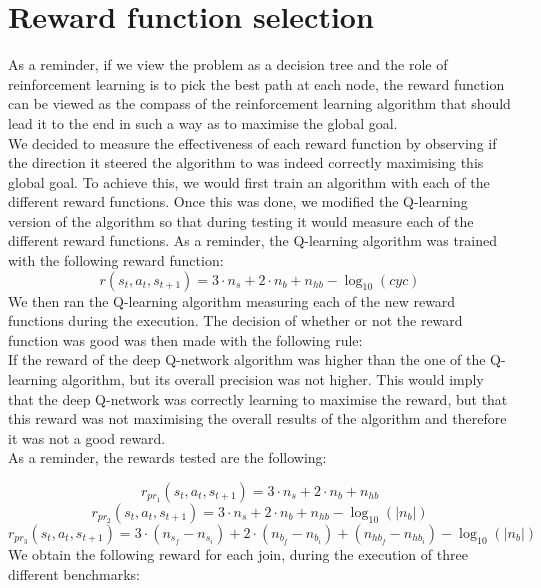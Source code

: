 \section{Reward function selection}
As a reminder, if we view the problem as a decision tree and the role of reinforcement learning is to pick the best path at each node, the reward function can be viewed as the compass of the reinforcement learning algorithm that should lead it to the end in such a way as to maximise the global goal.\\
We decided to measure the effectiveness of each reward function by observing if the direction it steered the algorithm to was indeed correctly maximising this global goal. To achieve this, we would first train an algorithm with each of the different reward functions. Once this was done, we modified the Q-learning version of the algorithm so that during testing it would measure each of the different reward functions. As a reminder, the Q-learning algorithm was trained with the following reward function:
\begin{equation}
	r(s_t,a_t,s_{t+1}) = 3  \cdot n_s + 2 \cdot n_b + n_{hb} - \log_{10}(cyc)
\end{equation}
We then ran the Q-learning algorithm measuring each of the new reward functions during the execution. The decision of whether or not the reward function was good was then made with the following rule:\\
If the reward of the deep Q-network algorithm was higher than the one of the Q-learning algorithm, but its overall precision was not higher. This would imply that the deep Q-network was correctly learning to maximise the reward, but that this reward was not maximising the overall results of the algorithm and therefore it was not a good reward.\\
As a reminder, the rewards tested are the following:
 
\begin{equation}
        r_{pr_1}(s_t,a_t,s_{t+1}) = 3  \cdot n_s + 2 \cdot n_b + n_{hb}
\end{equation}
\begin{equation}
        r_{pr_2}(s_t,a_t,s_{t+1}) = 3  \cdot n_s + 2 \cdot n_b + n_{hb} - \log_{10}(|n_b|)
\end{equation}
\begin{equation}
        r_{pr_3}(s_t,a_t,s_{t+1}) = 3  \cdot (n_{s_f} - n_{s_i}) + 2 \cdot (n_{b_f} - n_{b_i}) + (n_{hb_f} - n_{hb_i}) - \log_{10}(|n_b|)
\end{equation}
We obtain the following reward for each join, during the execution of three different benchmarks: 

